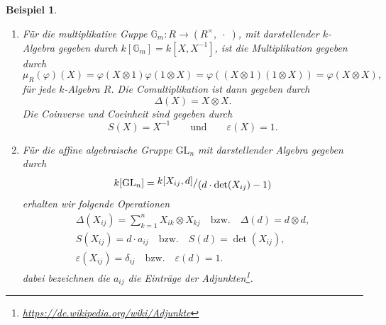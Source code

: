 \documentclass[a4paper, 11pt]{scrartcl}
\newcommand{\ringquot}[2]{{\raisebox{.2em}{\(#1\)}/\raisebox{-.2em}{\(#2\)}}}
\theoremstyle{basicstyle}
\newtheorem{beispiel}[definition]{Beispiel}
\begin{document}
\begin{beispiel}
\begin{enumerate}
            \item Für die multiplikative Guppe \(\mathbb{G}_m : R \to (R^\times, \;\cdot\;)\), mit darstellender \(k\)-Algebra gegeben durch \(k[\mathbb{G}_m] = k[X, X^{-1}]\), ist die Multiplikation gegeben durch
                \[\mu_R(\varphi)(X) = \varphi(X \otimes 1)\varphi(1 \otimes X) = \varphi((X \otimes 1)(1 \otimes X)) = \varphi(X \otimes X),\]
                für jede \(k\)-Algebra \(R\).
                Die Comultiplikation ist dann gegeben durch 
                \[\Delta (X) = X \otimes X.\]
                Die Coinverse und Coeinheit sind gegeben durch
                \[S(X) = X^{-1} \qquad\text{und}\qquad \varepsilon(X) = 1.\]

            \item Für die affine algebraische Gruppe \(\text{GL}_n\) mit darstellender Algebra gegeben durch
                \[k[\text{GL}_n] = \ringquot{k[X_{ij}, d]}{(d \cdot \det(X_{ij}) - 1)}\]
                erhalten wir folgende Operationen
                \begin{gather*}
                    \Delta(X_{ij}) = \sum_{k = 1}^{n} X_{ik} \otimes X_{kj} \quad\text{bzw.}\quad \Delta(d) = d \otimes d, \\
                    S(X_{ij}) = d \cdot a_{ij} \quad\text{bzw.}\quad S(d) = \det(X_{ij}), \\
                    \varepsilon(X_{ij}) = \delta_{ij} \quad\text{bzw.}\quad \varepsilon(d) = 1.
                \end{gather*}
                dabei bezeichnen die \(a_{ij}\) die Einträge der Adjunkten\footnote[1]{\url{https://de.wikipedia.org/wiki/Adjunkte}}.
        \end{enumerate}
    \end{beispiel}
\end{document}
